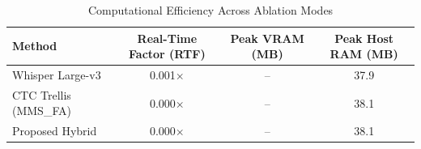 \begin{table}[t]
\centering
\caption{Computational Efficiency Across Ablation Modes}
\label{tab:computational_performance}
\begin{tabular}{lccc}
\toprule
Method & Real-Time Factor (RTF) & Peak VRAM (MB) & Peak Host RAM (MB) \\
\midrule
Whisper Large-v3 & 0.001\(\times\) & -- & 37.9 \\
CTC Trellis (MMS\_FA) & 0.000\(\times\) & -- & 38.1 \\
Proposed Hybrid & 0.000\(\times\) & -- & 38.1 \\
\bottomrule
\end{tabular}
\end{table}
